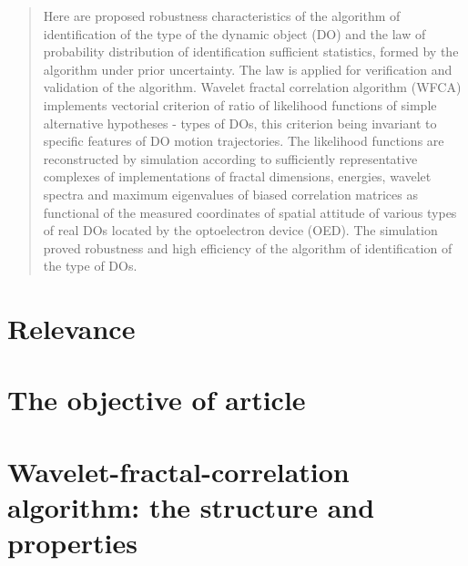 \documentclass[
11pt,%
tightenlines,%
twoside,%
onecolumn,%
nofloats,%
nobibnotes,%
nofootinbib,%
superscriptaddress,%
noshowpacs,%
centertags]%
{revtex4}
\begin{document}
\begin{abstract}
Here are proposed robustness characteristics of the algorithm of identification of the type of the dynamic object (DO) and the law of probability distribution of identification sufficient statistics, formed by the algorithm under prior uncertainty.
The law is applied for verification and validation of the algorithm.
Wavelet fractal correlation algorithm (WFCA) implements vectorial criterion of ratio of likelihood functions of simple alternative hypotheses - types of DOs, this criterion being invariant to specific features of DO motion trajectories.
The likelihood functions are reconstructed by simulation according to sufficiently representative complexes of implementations of fractal dimensions, energies, wavelet spectra and maximum eigenvalues of biased correlation matrices as functional of the measured coordinates of spatial attitude of various types of real DOs located by the optoelectron device (OED).
The simulation proved  robustness and high efficiency of the algorithm of identification of the type of DOs.
\end{abstract}



\maketitle


\section{Relevance}



\section{The objective of article}



\section{Wavelet-fractal-correlation algorithm: the structure and properties}


\end{document}
